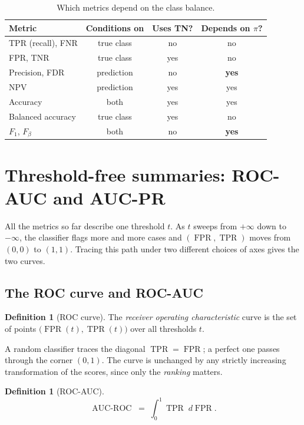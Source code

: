 \documentclass[11pt,a4paper]{article}
\DeclareMathOperator{\TPR}{TPR}
\DeclareMathOperator{\FPR}{FPR}
\DeclareMathOperator{\AUROC}{AUC\text{-}ROC}
\theoremstyle{plain}
\theoremstyle{definition}
\newtheorem{definition}[theorem]{Definition}
\theoremstyle{remark}
\begin{document}
\begin{table}[h]
\centering
\small
\caption{Which metrics depend on the class balance.}
\begin{tabular}{@{}lccc@{}}
\toprule
Metric & Conditions on & Uses TN? & Depends on $\pi$? \\
\midrule
TPR (recall), FNR & true class & no  & no \\
FPR, TNR          & true class & yes & no \\
Precision, FDR    & prediction & no  & \textbf{yes} \\
NPV               & prediction & yes & yes \\
Accuracy          & both       & yes & yes \\
Balanced accuracy & true class & yes & no \\
$F_1$, $F_\beta$  & both       & no  & \textbf{yes} \\
\bottomrule
\end{tabular}
\end{table}

\section{Threshold-free summaries: ROC-AUC and AUC-PR}

All the metrics so far describe one threshold $t$. As $t$ sweeps from $+\infty$ down to $-\infty$,
the classifier flags more and more cases and $(\FPR,\TPR)$ moves from $(0,0)$ to $(1,1)$. Tracing
this path under two different choices of axes gives the two curves.

\subsection{The ROC curve and ROC-AUC}

\begin{definition}[ROC curve]
The \emph{receiver operating characteristic} curve is the set of points
$\big(\FPR(t),\TPR(t)\big)$ over all thresholds $t$.
\end{definition}

A random classifier traces the diagonal $\TPR=\FPR$; a perfect one passes through the corner $(0,1)$. The
curve is unchanged by any strictly increasing transformation of the scores, since only the \emph{ranking}
matters.

\begin{definition}[ROC-AUC]
\[
  \AUROC \;=\; \int_0^1 \TPR\; d\FPR.
\]
\end{definition}
\end{document}
